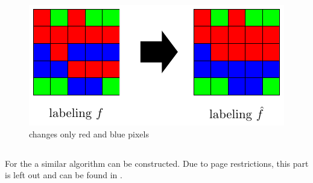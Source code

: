 \documentclass[runningheads,a4paper]{llncs}
\begin{document}
    \begin{figure}[H]
        \centering
        \includegraphics[width=.6\textwidth]{../figures/swap_change/swap_change.pdf}
        \caption{\abswap changes only red and blue pixels}
        \label{fig:abswapchange}
    \end{figure}

    
   \subsection{\aexp}
        For the \aexp a similar algorithm can be constructed. Due to page restrictions, this part is left out and can be found in \cite{paper}.
\end{document}
